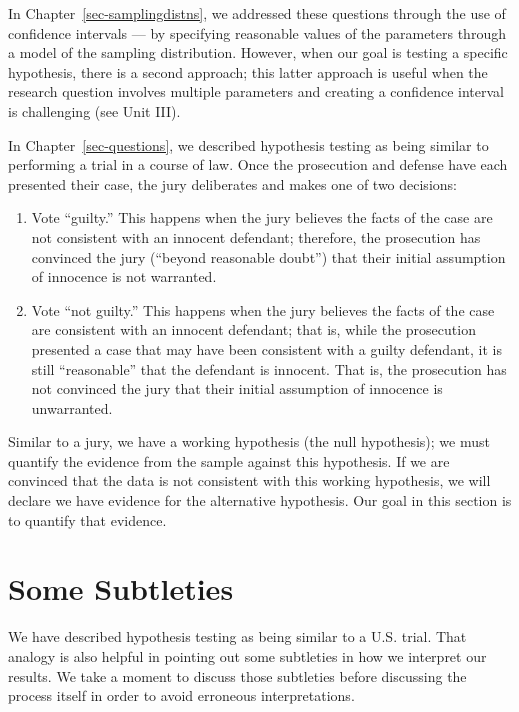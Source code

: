 \documentclass[
  letterpaper,
  DIV=11,
  numbers=noendperiod]{scrreprt}
\providecommand{\tightlist}{%
  \setlength{\itemsep}{0pt}\setlength{\parskip}{0pt}}\usepackage{longtable,booktabs,array}
\theoremstyle{plain}
\theoremstyle{definition}
\theoremstyle{definition}
\theoremstyle{remark}
\begin{document}
In Chapter~\ref{sec-samplingdistns}, we addressed these questions
through the use of confidence intervals --- by specifying reasonable
values of the parameters through a model of the sampling distribution.
However, when our goal is testing a specific hypothesis, there is a
second approach; this latter approach is useful when the research
question involves multiple parameters and creating a confidence interval
is challenging (see Unit III).

In Chapter~\ref{sec-questions}, we described hypothesis testing as being
similar to performing a trial in a course of law. Once the prosecution
and defense have each presented their case, the jury deliberates and
makes one of two decisions:

\begin{enumerate}
\def\labelenumi{\arabic{enumi}.}
\tightlist
\item
  Vote ``guilty.'' This happens when the jury believes the facts of the
  case are not consistent with an innocent defendant; therefore, the
  prosecution has convinced the jury (``beyond reasonable doubt'') that
  their initial assumption of innocence is not warranted.
\item
  Vote ``not guilty.'' This happens when the jury believes the facts of
  the case are consistent with an innocent defendant; that is, while the
  prosecution presented a case that may have been consistent with a
  guilty defendant, it is still ``reasonable'' that the defendant is
  innocent. That is, the prosecution has not convinced the jury that
  their initial assumption of innocence is unwarranted.
\end{enumerate}

Similar to a jury, we have a working hypothesis (the null hypothesis);
we must quantify the evidence from the sample against this hypothesis.
If we are convinced that the data is not consistent with this working
hypothesis, we will declare we have evidence for the alternative
hypothesis. Our goal in this section is to quantify that evidence.

\hypertarget{some-subtleties}{%
\section{Some Subtleties}\label{some-subtleties}}

We have described hypothesis testing as being similar to a U.S. trial.
That analogy is also helpful in pointing out some subtleties in how we
interpret our results. We take a moment to discuss those subtleties
before discussing the process itself in order to avoid erroneous
interpretations.
\end{document}
